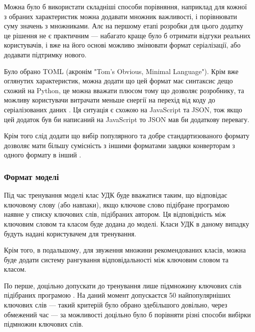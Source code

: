 \documentclass[14pt]{extarticle}
\begin{document}
  Можна було б використати складніші способи порівняння,
  наприклад для кожної з обраних характеристик можна додавати множник
  важливості, і порівнювати суму значень з множниками.
  Алє на першому етапі розробки для цього додатку це рішення не є практичним ---
  набагато краще було б отримати відгуки реальних користувачів,
  і вже на його основі можливо змінювати формат серіалізації,
  або додавати підтримку нового.

  Було обрано TOML (акронім "Tom's Obvious, Minimal Language").
  Крім вже оглянутих характеристик,
  можна додати що цей формат має синтаксис дещо схожий на Python,
  це можна вважати плюсом тому що дозволяє розробнику,
  та можливу користувачи витрачати меньше єнергії
  на перехід від коду до серіалізованих даних \cite{Code_complete_5_2}.
  Ця ситуація є схожою на JavaScript та JSON,
  тож якщо цей додаток був би написаний на JavaScript
  то JSON мав би додаткову перевагу.

  Крім того слід додати що вибір популярного
  та добре стандартизованого формату дозволяє мати більшу сумісність
  з іншими форматами завдяки конверторам з одного формату в інший
  \cite{github_json2toml,github_xmltodict,github_x2js}.
  
  \subsubsection{Формат моделі}

  Під час тренування моделі клас УДК буде вважатися таким,
  що відповідає ключовому слову (або навпаки),
  якщо ключове слово підібране програмою наявне у списку ключових слів,
  підібраних автором.
  Ця відповідність між ключовим словом та класом буде додана до моделі.
  Класи УДК в даному випадку будуть надані користувачем для тренування.

  Крім того, в подальшому, для звуження множини рекомендованих класів,
  можна буде додати систему рангування відповідальності між ключовим словом
  та класом.

  По перше, доцільно допускати до тренування лише підмножину ключових слів
  підібраних програмою \cite{wiki_sampling}.
  На даний момент допускаєтся 50 найпопулярніших ключових слів ---
  такий критерій було обрано здебільшого довільно, через обмежений час ---
  за можливості доцільно було б порівняти різні способи вибірки
  \cite{wiki_sampling_methods}
  підмножин ключових слів.
\end{document}
